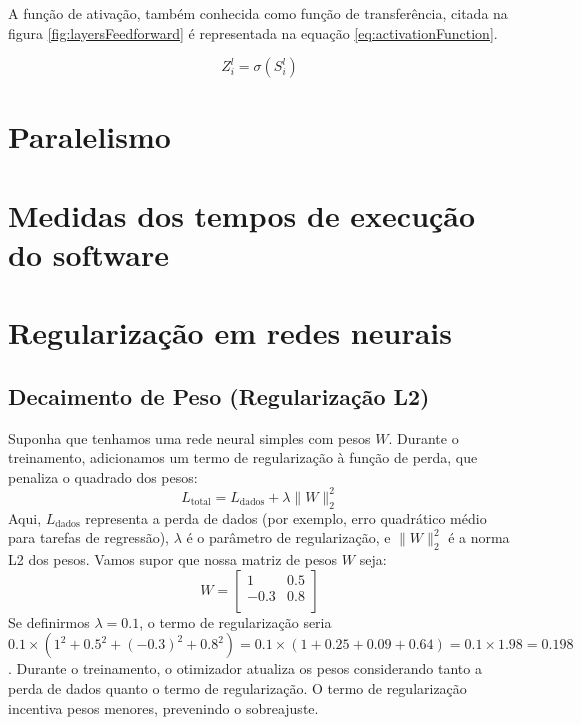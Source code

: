 \begin{apendicesenv}
	\par A função de ativação, também conhecida como função de transferência, citada na figura \ref{fig:layersFeedforward} é representada na equação \ref{eq:activationFunction}.
	
	\begin{equation}\label{eq:activationFunction}
		Z^l_i = \sigma(S^l_i)
	\end{equation}
	
	\chapter{Paralelismo}
		\par 
		
		\chapter{Medidas dos tempos de execução do software}



	\chapter{Regularização em redes neurais}

	\section{Decaimento de Peso (Regularização L2)}
		\label{Apend:regularization}
		\par Suponha que tenhamos uma rede neural simples com pesos \( W \). Durante o treinamento, adicionamos um termo de regularização à função de perda, que penaliza o quadrado dos pesos:
		\begin{equation}
			L_{\text{total}} = L_{\text{dados}} + \lambda \|W\|^2_2
		\end{equation}
		Aqui, \( L_{\text{dados}} \) representa a perda de dados (por exemplo, erro quadrático médio para tarefas de regressão), \( \lambda \) é o parâmetro de regularização, e \( \|W\|^2_2 \) é a norma L2 dos pesos.
		Vamos supor que nossa matriz de pesos \( W \) seja:
		\[ W = \begin{bmatrix} 
			1 & 0.5 \\
			-0.3 & 0.8 \\
		\end{bmatrix} \]
		Se definirmos \( \lambda = 0.1 \), o termo de regularização seria \( 0.1 \times (1^2 + 0.5^2 + (-0.3)^2 + 0.8^2) = 0.1 \times (1 + 0.25 + 0.09 + 0.64) = 0.1 \times 1.98 = 0.198 \).
		Durante o treinamento, o otimizador atualiza os pesos considerando tanto a perda de dados quanto o termo de regularização. O termo de regularização incentiva pesos menores, prevenindo o sobreajuste.


\end{apendicesenv}

